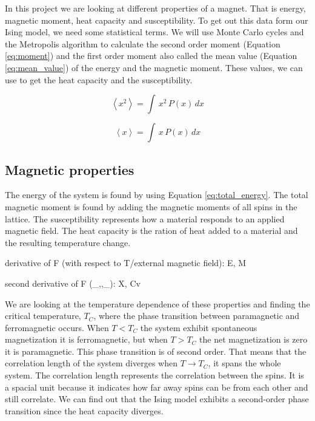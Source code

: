 In this project we are looking at different properties of a magnet. That is energy, magnetic moment, heat capacity and susceptibility. To get out this data form our Ising model, we need some statistical terms. We will use Monte Carlo cycles and the Metropolis algorithm to calculate the second order moment (Equation \ref{eq:moment}) and the first order moment also called the mean value (Equation \ref{eq:mean_value}) of the energy and the magnetic moment. These values, we can use to get the heat capacity and the susceptibility.

\begin{equation}\label{eq:moment}
\left< x^2 \right> = \int \,x^2 \,P(x)\,dx
\end{equation}

\begin{equation}\label{eq:mean_value}
\left< x \right> = \int \,x \,P(x)\,dx
\end{equation}

\subsection{Magnetic properties}

The energy of the system is found by using Equation \ref{eq:total_energy}. The total magnetic moment is found by adding the magnetic moments of all spins in the lattice. The susceptibility represents how a material responds to an applied magnetic field. The heat capacity is the ration of heat added to a material and the resulting temperature change. 

derivative of F (with respect to T/external magnetic field): E, M

second derivative of F (\_,,\_): X, Cv

We are looking at the temperature dependence of these properties and finding the critical temperature, $T_C$,  where the phase transition between paramagnetic and ferromagnetic occurs. When $T< T_C$ the system exhibit spontaneous magnetization it is ferromagnetic, but when $T > T_C$ the net magnetization is zero it is paramagnetic. This phase transition is of second order. That means that the correlation length of the system diverges when $T \rightarrow T_C$, it spans the whole system. The correlation length represents the correlation between the spins. It is a spacial unit because it indicates how far away spins can be from each other and still correlate. We can find out that the Ising model exhibits a second-order phase transition since the heat capacity diverges.


